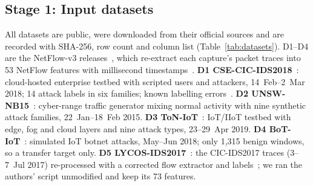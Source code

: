 \documentclass[conference]{IEEEtran}
\begin{document}
\subsection{Stage 1: Input datasets}
All datasets are public, were downloaded from their official sources and are recorded with SHA-256, row count and column list (Table~\ref{tab:datasets}). D1--D4 are the NetFlow-v3 releases~\cite{luay2025}, which re-extract each capture's packet traces into 53 NetFlow features with millisecond timestamps~\cite{sarhan2021netflow}.
\textbf{D1 CSE-CIC-IDS2018}~\cite{sharafaldin2018}: cloud-hosted enterprise testbed with scripted users and attackers, 14~Feb--2~Mar 2018; 14 attack labels in six families; known labelling errors~\cite{liu2022errors}.
\textbf{D2 UNSW-NB15}~\cite{moustafa2015}: cyber-range traffic generator mixing normal activity with nine synthetic attack families, 22~Jan--18~Feb 2015.
\textbf{D3 ToN-IoT}~\cite{moustafa2021}: IoT/IIoT testbed with edge, fog and cloud layers and nine attack types, 23--29~Apr 2019.
\textbf{D4 BoT-IoT}~\cite{koroniotis2019}: simulated IoT botnet attacks, May--Jun 2018; only 1,315 benign windows, so a transfer target only.
\textbf{D5 LYCOS-IDS2017}~\cite{rosay2021}: the CIC-IDS2017 traces (3--7~Jul 2017) re-processed with a corrected flow extractor and labels~\cite{engelen2021}; we ran the authors' script unmodified and keep its 73 features.


\end{document}
